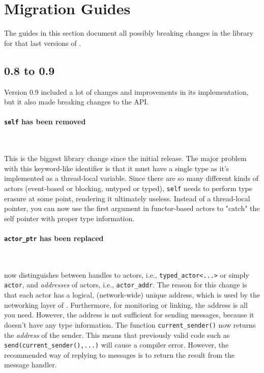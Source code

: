 \section{Migration Guides}

The guides in this section document all possibly breaking changes in the
library for that last versions of \lib.

\subsection{0.8 to 0.9}

Version 0.9 included a lot of changes and improvements in its implementation,
but it also made breaking changes to the API.

\paragraph{\lstinline^self^ has been removed}

~

This is the biggest library change since the initial release. The major problem
with this keyword-like identifier is that it must have a single type as it's
implemented as a thread-local variable. Since there are so many different kinds
of actors (event-based or blocking, untyped or typed), \lstinline^self^ needs
to perform type erasure at some point, rendering it ultimately useless. Instead
of a thread-local pointer, you can now use the first argument in functor-based
actors to "catch" the self pointer with proper type information.

\paragraph{\lstinline^actor_ptr^ has been replaced}

~

\lib now distinguishes between handles to actors, i.e.,
\lstinline^typed_actor<...>^ or simply \lstinline^actor^, and \emph{addresses}
of actors, i.e., \lstinline^actor_addr^. The reason for this change is that
each actor has a logical, (network-wide) unique address, which is used by the
networking layer of \lib. Furthermore, for monitoring or linking, the address
is all you need. However, the address is not sufficient for sending messages,
because it doesn't have any type information. The function
\lstinline^current_sender()^ now returns the \emph{address} of the sender. This
means that previously valid code such as \lstinline^send(current_sender(),...)^
will cause a compiler error. However, the recommended way of replying to
messages is to return the result from the message handler.

